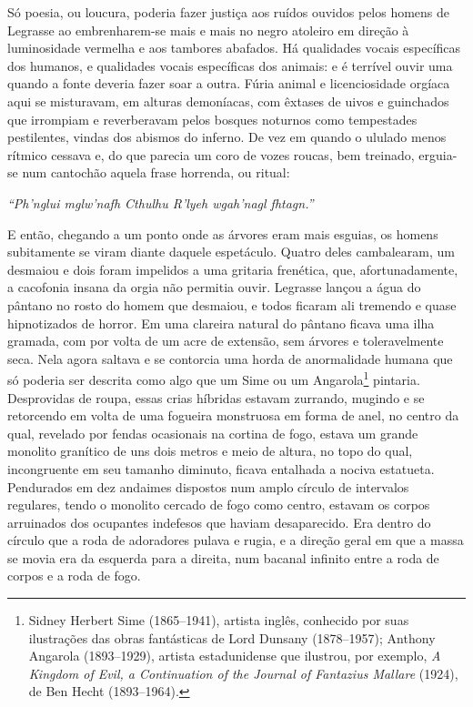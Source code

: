 Só poesia, ou loucura, poderia fazer justiça aos ruídos ouvidos pelos
homens de Legrasse ao embrenharem-se mais e mais no negro atoleiro em
direção à luminosidade vermelha e aos tambores abafados. Há qualidades
vocais específicas dos humanos, e qualidades vocais específicas dos
animais: e é terrível ouvir uma quando a fonte deveria fazer soar a
outra. Fúria animal e licenciosidade orgíaca aqui se misturavam, em
alturas demoníacas, com êxtases de uivos e guinchados que irrompiam e
reverberavam pelos bosques noturnos como tempestades pestilentes, vindas
dos abismos do inferno. De vez em quando o ululado menos rítmico cessava
e, do que parecia um coro de vozes roucas, bem treinado, erguia-se num
cantochão aquela frase horrenda, ou ritual:

\emph{``Ph'nglui mglw'nafh Cthulhu R'lyeh wgah'nagl fhtagn.''}

E então, chegando a um ponto onde as árvores eram mais esguias, os
homens subitamente se viram diante daquele espetáculo. Quatro deles
cambalearam, um desmaiou e dois foram impelidos a uma gritaria
frenética, que, afortunadamente, a cacofonia insana da orgia não
permitia ouvir. Legrasse lançou a água do pântano no rosto do homem que
desmaiou, e todos ficaram ali tremendo e quase hipnotizados de horror.
Em uma clareira natural do pântano ficava uma ilha gramada, com por
volta de um acre de extensão, sem árvores e toleravelmente seca. Nela
agora saltava e se contorcia uma horda de anormalidade humana que só
poderia ser descrita como algo que um Sime ou um Angarola\footnote{Sidney
  Herbert Sime (1865--1941), artista inglês, conhecido por suas
  ilustrações das obras fantásticas de Lord Dunsany (1878--1957); Anthony
  Angarola (1893--1929), artista estadunidense que ilustrou, por exemplo,
  \emph{A Kingdom of Evil, a Continuation of the Journal of Fantazius
  Mallare} (1924), de Ben Hecht (1893--1964).} pintaria. Desprovidas de
roupa, essas crias híbridas estavam zurrando, mugindo e se retorcendo em
volta de uma fogueira monstruosa em forma de anel, no centro da qual,
revelado por fendas ocasionais na cortina de fogo, estava um grande
monolito granítico de uns dois metros e meio de altura, no topo do qual,
incongruente em seu tamanho diminuto, ficava entalhada a nociva
estatueta. Pendurados em dez andaimes dispostos num amplo círculo de
intervalos regulares, tendo o monolito cercado de fogo como centro,
estavam os corpos arruinados dos ocupantes indefesos que haviam
desaparecido. Era dentro do círculo que a roda de adoradores pulava e
rugia, e a direção geral em que a massa se movia era da esquerda para a
direita, num bacanal infinito entre a roda de corpos e a roda de fogo.


